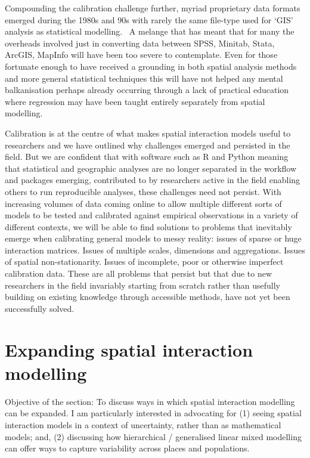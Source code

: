 \documentclass[11pt,letterpaper]{article}
\begin{document}
Compounding the calibration challenge further, myriad proprietary data formats emerged during the 1980s and 90s with rarely the same file-type used for `GIS' analysis as statistical modelling.
~A melange that has meant that for many the overheads involved just in converting data between SPSS, Minitab, Stata, ArcGIS, MapInfo will have been too severe to contemplate.
Even for those fortunate enough to have received a grounding in both spatial analysis methods and more general statistical techniques this will have not helped any mental balkanisation perhaps already occurring through a lack of practical education where regression may have been taught entirely separately from spatial modelling.

Calibration is at the centre of what makes spatial interaction models useful to researchers and we have outlined why challenges emerged and persisted in the field.
But we are confident that with software such as R and Python meaning that statistical and geographic analyses are no longer separated in the workflow and packages emerging, contributed to by researchers active in the field enabling others to run reproducible analyses, these challenges need not persist.
With increasing volumes of data coming online to allow multiple different sorts of models to be tested and calibrated against empirical observations in a variety of different contexts, we will be able to find solutions to problems that inevitably emerge when calibrating general models to messy reality: issues of sparse or huge interaction matrices.
Issues of multiple scales, dimensions and aggregations.
Issues of spatial non-stationarity.
Issues of incomplete, poor or otherwise imperfect calibration data.
These are all problems that persist but that due to new researchers in the field invariably starting from scratch rather than usefully building on existing knowledge through accessible methods, have not yet been successfully solved.

\hypertarget{expanding-spatial-interaction-modelling}{%
\section{Expanding spatial interaction modelling}\label{expanding-spatial-interaction-modelling}}

Objective of the section: To discuss ways in which spatial interaction modelling can be expanded.
I am particularly interested in advocating for (1) seeing spatial interaction models in a context of uncertainty, rather than as mathematical models; and, (2) discussing how hierarchical / generalised linear mixed modelling can offer ways to capture variability across places and populations.
\end{document}
